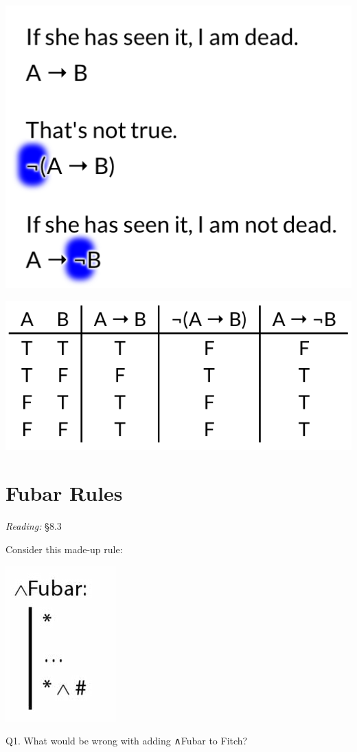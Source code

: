 \documentclass[12pt]{extarticle}
\begin{document}
\begin{multicols*}{3}
\begin{center}
\includegraphics[scale=0.3]{img/not_if.png}
\end{center}
\begin{center}
\includegraphics[scale=0.3]{img/not_if_tt.png}
\end{center}
 
 
\section{Fubar Rules}
 
\emph{Reading:} §8.3
 
\begin{minipage}{\columnwidth}
 
Consider this made-up rule:
 
\begin{center}
\includegraphics[scale=0.3]{img/fubar_rule.png}
\end{center}
Q1. What would be wrong with adding ∧Fubar to Fitch?
 

\end{minipage}
\end{multicols*}
\end{document}

